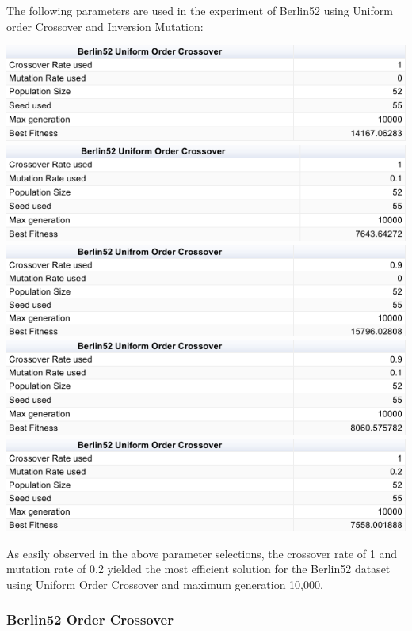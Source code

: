 \documentclass[conference]{IEEEtran}
\begin{document}
The following parameters are used in the experiment of Berlin52 using Uniform order Crossover and Inversion Mutation:
\graphicspath{ {Parameter_results/} }
\includegraphics[scale=0.42]{Berlin52/UOC/Berlin52_UOC_a)_table}
\includegraphics[scale=0.42]{Berlin52/UOC/Berlin52_UOC_b)_table}
\includegraphics[scale=0.42]{Berlin52/UOC/Berlin52_UOC_c)_table}
\includegraphics[scale=0.42]{Berlin52/UOC/Berlin52_UOC_d)_table}
\includegraphics[scale=0.42]{Berlin52/UOC/Berlin52_UOC_e)_table}

As easily observed in the above parameter selections, the crossover rate of 1 and mutation rate of 0.2 yielded the most efficient solution for the Berlin52 dataset using Uniform Order Crossover and maximum generation 10,000.

\subsubsection{Berlin52 Order Crossover}
\end{document}
